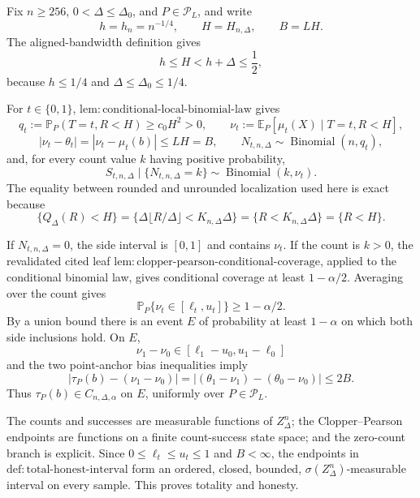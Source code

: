 Fix \(n\geq256\), \(0<\Delta\leq\Delta_0\), and \(P\in\mathcal P_L\), and write
\[
 h=h_n=n^{-1/4},\qquad H=H_{n,\Delta},\qquad B=LH.
\]
The aligned-bandwidth definition gives
\[
 h\leq H<h+\Delta\leq\frac12,
\]
because \(h\leq1/4\) and \(\Delta\leq\Delta_0\leq1/4\).

For \(t\in\{0,1\}\), \(\mathrm{lem:conditional\text{-}local\text{-}binomial\text{-}law}\) gives
\[
 q_t:=\mathbb P_P(T=t,R<H)\geq c_0H^2>0,
 \qquad
 \nu_t:=\mathbb E_P[\mu_t(X)\mid T=t,R<H],
\]
\[
 |\nu_t-\theta_t|=|\nu_t-\mu_t(b)|\leq LH=B,
 \qquad
 N_{t,n,\Delta}\sim\operatorname{Binomial}(n,q_t),
\]
and, for every count value \(k\) having positive probability,
\[
 S_{t,n,\Delta}\mid\{N_{t,n,\Delta}=k\}
 \sim\operatorname{Binomial}(k,\nu_t).
\]
The equality between rounded and unrounded localization used here is exact because
\[
 \{Q_\Delta(R)<H\}
 =\{\Delta\lfloor R/\Delta\rfloor<K_{n,\Delta}\Delta\}
 =\{R<K_{n,\Delta}\Delta\}
 =\{R<H\}.
\]

If \(N_{t,n,\Delta}=0\), the side interval is \([0,1]\) and contains \(\nu_t\).  If the count is \(k>0\), the revalidated cited leaf \(\mathrm{lem:clopper\text{-}pearson\text{-}conditional\text{-}coverage}\), applied to the conditional binomial law, gives conditional coverage at least \(1-\alpha/2\).  Averaging over the count gives
\[
 \mathbb P_P\{\nu_t\in[\ell_t,u_t]\}\geq1-\alpha/2.
\]
By a union bound there is an event \(E\) of probability at least \(1-\alpha\) on which both side inclusions hold.  On \(E\),
\[
 \nu_1-\nu_0\in[\ell_1-u_0,u_1-\ell_0]
\]
and the two point-anchor bias inequalities imply
\[
 |\tau_P(b)-(\nu_1-\nu_0)|
 =|(\theta_1-\nu_1)-(\theta_0-\nu_0)|
 \leq2B.
\]
Thus \(\tau_P(b)\in C_{n,\Delta,\alpha}\) on \(E\), uniformly over \(P\in\mathcal P_L\).

The counts and successes are measurable functions of \(Z_\Delta^n\); the Clopper--Pearson endpoints are functions on a finite count-success state space; and the zero-count branch is explicit.  Since \(0\leq\ell_t\leq u_t\leq1\) and \(B<\infty\), the endpoints in \(\mathrm{def:total\text{-}honest\text{-}interval}\) form an ordered, closed, bounded, \(\sigma(Z_\Delta^n)\)-measurable interval on every sample.  This proves totality and honesty.

